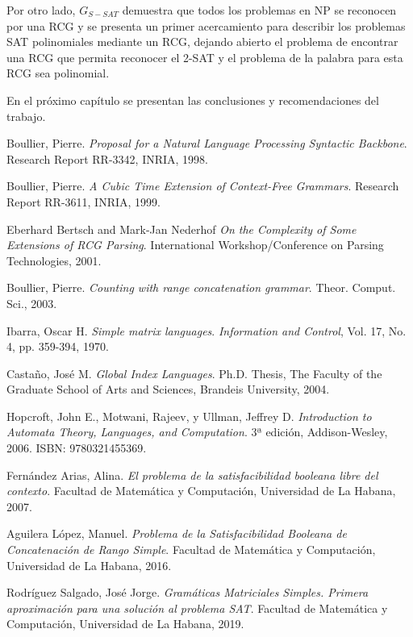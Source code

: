 \documentclass[12pt]{article}
\begin{document}
Por otro lado, $G_{S-SAT}$ demuestra que todos los problemas en NP se reconocen por una RCG y se presenta un primer acercamiento para describir los problemas SAT polinomiales mediante un RCG, dejando abierto el problema de encontrar una RCG que permita reconocer el 2-SAT y el problema de la palabra para esta RCG sea polinomial.

En el próximo capítulo se presentan las conclusiones y recomendaciones del trabajo.

\begin{thebibliography}{99}
    
    Boullier, Pierre.
    \textit{Proposal for a Natural Language Processing Syntactic Backbone}.
    Research Report RR-3342, INRIA, 1998.
    
    Boullier, Pierre.
    \textit{A Cubic Time Extension of Context-Free Grammars}.
    Research Report RR-3611, INRIA, 1999.
    
    Eberhard Bertsch and Mark-Jan Nederhof
    \textit{On the Complexity of Some Extensions of RCG Parsing}.
    International Workshop/Conference on Parsing Technologies, 2001.
    
    Boullier, Pierre.
    \textit{Counting with range concatenation grammar}.
    Theor. Comput. Sci., 2003.
    
    Ibarra, Oscar H.
    \textit{Simple matrix languages}.
    \textit{Information and Control}, Vol. 17, No. 4, pp. 359-394, 1970.
    
    Castaño, José M.
    \textit{Global Index Languages}.
    Ph.D. Thesis, The Faculty of the Graduate School of Arts and Sciences, Brandeis University, 2004.
    
    Hopcroft, John E., Motwani, Rajeev, y Ullman, Jeffrey D.
    \textit{Introduction to Automata Theory, Languages, and Computation}.
    3ª edición, Addison-Wesley, 2006. ISBN: 9780321455369.
    
    Fernández Arias, Alina.
    \textit{El problema de la satisfacibilidad booleana libre del contexto}.
    Facultad de Matemática y Computación, Universidad de La Habana, 2007.
    
    Aguilera López, Manuel.
    \textit{Problema de la Satisfacibilidad Booleana de Concatenación de Rango Simple}.
    Facultad de Matemática y Computación, Universidad de La Habana, 2016.
    
    Rodríguez Salgado, José Jorge.
    \textit{Gramáticas Matriciales Simples. Primera aproximación para una solución al problema SAT}.
    Facultad de Matemática y Computación, Universidad de La Habana, 2019.
    
\end{thebibliography}
\end{document}
